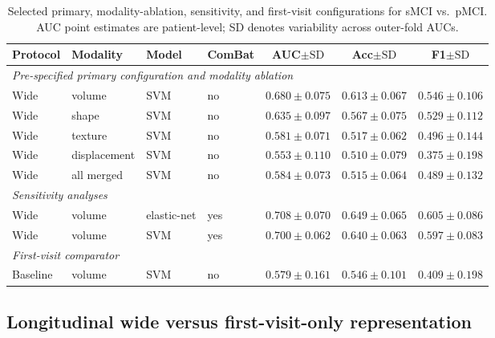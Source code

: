 \documentclass[review]{elsarticle}
\begin{document}
	\begin{table}[htbp]
		\centering
		\footnotesize
		\setlength{\tabcolsep}{4pt}
		\caption{Selected primary, modality-ablation, sensitivity, and first-visit configurations for sMCI vs.\ pMCI. AUC point estimates are patient-level; SD denotes variability across outer-fold AUCs.}
		\label{tab:main_results}
		\begin{tabular}{@{}llllccc@{}}
			\toprule
			Protocol & Modality & Model & ComBat &
			AUC$\pm\mathrm{SD}$ & Acc$\pm\mathrm{SD}$ & F1$\pm\mathrm{SD}$ \\
			\midrule
			\multicolumn{7}{l}{\textit{Pre-specified primary configuration and modality ablation}} \\
			Wide & volume       & SVM         & no  & $0.680 \pm 0.075$ & $0.613 \pm 0.067$ & $0.546 \pm 0.106$ \\
			Wide & shape        & SVM         & no  & $0.635 \pm 0.097$ & $0.567 \pm 0.075$ & $0.529 \pm 0.112$ \\
			Wide & texture      & SVM         & no  & $0.581 \pm 0.071$ & $0.517 \pm 0.062$ & $0.496 \pm 0.144$ \\
			Wide & displacement & SVM         & no  & $0.553 \pm 0.110$ & $0.510 \pm 0.079$ & $0.375 \pm 0.198$ \\
			Wide & all merged   & SVM         & no  & $0.584 \pm 0.073$ & $0.515 \pm 0.064$ & $0.489 \pm 0.132$ \\
			\midrule
			\multicolumn{7}{l}{\textit{Sensitivity analyses}} \\
			Wide & volume       & elastic-net & yes & $0.708 \pm 0.070$ & $0.649 \pm 0.065$ & $0.605 \pm 0.086$ \\
			Wide & volume       & SVM         & yes & $0.700 \pm 0.062$ & $0.640 \pm 0.063$ & $0.597 \pm 0.083$ \\
			\midrule
			\multicolumn{7}{l}{\textit{First-visit comparator}} \\
			Baseline & volume     & SVM         & no  & $0.579 \pm 0.161$ & $0.546 \pm 0.101$ & $0.409 \pm 0.198$ \\
			\bottomrule
		\end{tabular}
	\end{table}
	
	\subsection{Longitudinal wide versus first-visit-only representation}
	
\end{document}
